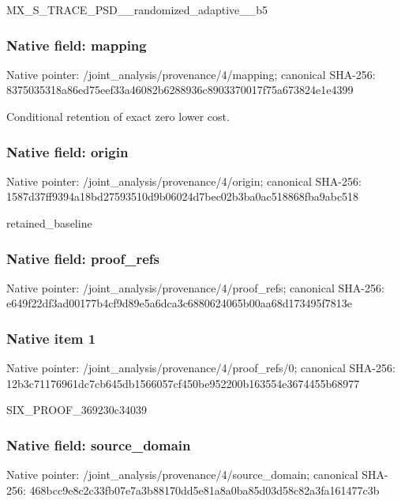 \documentclass[10pt,a4paper]{article}
\begin{document}
\begingroup\raggedright\sloppy MX\_\allowbreak{}S\_\allowbreak{}TRACE\_\allowbreak{}PSD\_\allowbreak{}\_\allowbreak{}randomized\_\allowbreak{}adaptive\_\allowbreak{}\_\allowbreak{}b5\par\endgroup

\subsubsection{Native field: mapping}
Native pointer: /joint\_\allowbreak{}analysis/provenance/4/mapping; canonical SHA-256: 8375035318a86ed75eef33a46082b6288936c8903370017f75a673824e1e4399

\begingroup\raggedright\sloppy Conditional retention of exact zero lower cost.\par\endgroup

\subsubsection{Native field: origin}
Native pointer: /joint\_\allowbreak{}analysis/provenance/4/origin; canonical SHA-256: 1587d37ff9394a18bd27593510d9b06024d7bec02b3ba0ac518868fba9abc518

\begingroup\raggedright\sloppy retained\_\allowbreak{}baseline\par\endgroup

\subsubsection{Native field: proof\_\allowbreak{}refs}
Native pointer: /joint\_\allowbreak{}analysis/provenance/4/proof\_\allowbreak{}refs; canonical SHA-256: e649f22df3ad00177b4cf9d89e5a6dca3c6880624065b00aa68d173495f7813e

\subsubsection{Native item 1}
Native pointer: /joint\_\allowbreak{}analysis/provenance/4/proof\_\allowbreak{}refs/0; canonical SHA-256: 12b3c71176961dc7cb645db1566057cf450be952200b163554e3674455b68977

\begingroup\raggedright\sloppy SIX\_\allowbreak{}PROOF\_\allowbreak{}369230c34039\par\endgroup

\subsubsection{Native field: source\_\allowbreak{}domain}
Native pointer: /joint\_\allowbreak{}analysis/provenance/4/source\_\allowbreak{}domain; canonical SHA-256: 468bcc9e8c2c33fb07e7a3b88170dd5e81a8a0ba85d03d58c82a3fa161477c3b
\end{document}
